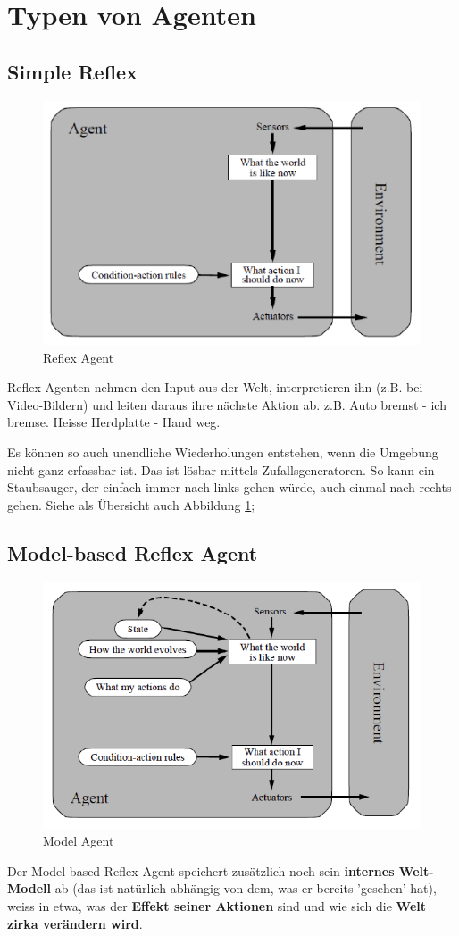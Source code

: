 \section{Typen von Agenten}
\subsection{Simple Reflex}
\begin{figure}[h!]
\centering
\includegraphics[width=0.5\linewidth]{fig/reflex_agent}
\caption{Reflex Agent}
\label{fig:reflex_agent}
\end{figure}
Reflex Agenten nehmen den Input aus der Welt, interpretieren ihn (z.B. bei Video-Bildern) und leiten daraus ihre nächste Aktion ab. z.B. Auto bremst - ich bremse. Heisse Herdplatte - Hand weg.

Es können so auch unendliche Wiederholungen entstehen, wenn die Umgebung nicht ganz-erfassbar ist. Das ist lösbar mittels Zufallsgeneratoren. So kann ein Staubsauger, der einfach immer nach links gehen würde, auch einmal nach rechts gehen. Siehe als Übersicht auch Abbildung \ref{fig:reflex_agent};
\subsection{Model-based Reflex Agent}
\begin{figure}[h!]
\centering
\includegraphics[width=0.5\linewidth]{fig/model_agent}
\caption{Model Agent}
\label{fig:model_agent}
\end{figure}
Der Model-based Reflex Agent speichert zusätzlich noch sein \textbf{internes Welt-Modell} ab (das ist natürlich abhängig von dem, was er bereits 'gesehen' hat), weiss in etwa, was der\textbf{ Effekt seiner Aktionen }sind und wie sich die \textbf{Welt zirka verändern wird}. 

